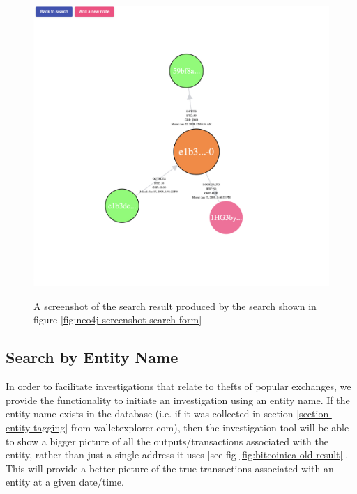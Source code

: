 \begin{figure}[h!]
  \centering
  \includegraphics[width = 15cm]{./figures/ui-screenshots/graph-basic}\\[0.5cm] 
  \caption{A screenshot of the search result produced by the search shown in figure \ref{fig:neo4j-screenshot-search-form}}
  \label{fig:neo4j-screenshot-basic-address-nodes}
\end{figure}

\subsection{Search by Entity Name}
In order to facilitate investigations that relate to thefts of popular exchanges, we provide the functionality to initiate an investigation using an entity name. If the entity name exists in the database (i.e. if it was collected in section \ref{section-entity-tagging} from walletexplorer.com), then the investigation tool will be able to show a bigger picture of all the outputs/transactions associated with the entity, rather than just a single address it uses [see fig \ref{fig:bitcoinica-old-result}]. This will provide a better picture of the true transactions associated with an entity at a given date/time. 

